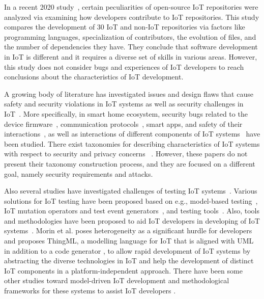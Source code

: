  In a recent 2020 study~\cite{IoTOSS2020}, certain peculiarities of open-source IoT repositories were analyzed via examining how developers contribute to IoT repositories. This study compares the development of 30 IoT and non-IoT repositories via factors like programming languages, specialization of contributors, the evolution of files, and the number of dependencies they have. They conclude that software development in IoT is different and it requires a diverse set of skills in various areas. However, this study does not consider bugs and experiences of IoT developers to reach conclusions about the characteristics of IoT development.

A growing body of literature has investigated issues and design flaws that cause safety and security violations in IoT systems as well as security challenges in IoT~\cite{IoTSecChallenges2017,edgeChallengesSurvey2019}. More specifically, in smart home ecosystem, security bugs related to the device firmware~\cite{nestFirmwareSecu,firmwareSec2017,firmwareSec2014}, communication protocols~\cite{protocolSec2017,protsec2016,fouladi2013honey}, smart apps, and safety of their interactions~\cite{celik2019iotguard,celik2018soteria,ISSTA2020Interactions}, as well as interactions of different components of IoT systems~\cite{securityUsenix2019} have been studied. There exist taxonomies for describing characteristics of IoT systems with respect to security and privacy concerns~\cite{alqassem2014taxonomy} \cite{chen2018internet}. However, these papers do not present their taxonomy construction process, and they are focused on a different goal, namely security requirements and attacks.

Also several studies have investigated challenges of testing IoT systems~\cite{ahmadMDBtesting2016,rosenkranz2015Testing,testingtools2018,voas2018testing}. Various solutions for IoT testing have been proposed based on e.g., model-based testing~\cite{ahmadMDBtesting2016}, IoT mutation operators and test event generators~\cite{gutierrez2019evolutionary,gutierrez2018iot}, and testing tools~\cite{testingtools2018}. Also, tools and methodologies have been proposed to aid IoT developers in developing of IoT systems~\cite{MorinUMLforIoT2017,krishna2019iot,corno2019towards}.  Morin et al. \cite{MorinUMLforIoT2017} poses heterogeneity as a significant hurdle for developers and proposes ThingML, a modelling language for IoT that is aligned with UML in addition to a code generator \cite{harrand2016thingml}, to allow rapid development of IoT systems by abstracting the diverse technologies in IoT and help the development of distinct IoT components in a platform-independent approach. There have been some other studies toward model-driven IoT development and methodological frameworks for these systems to assist IoT developers \cite{patel2015enabling}.

